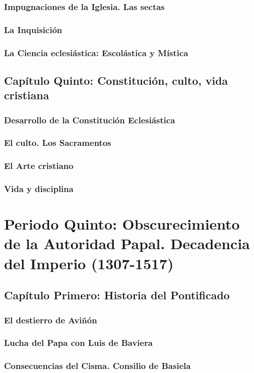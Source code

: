 \raggedbottom{} \documentclass[12pt, a4paper]{book}
\begin{document}
\section{Impugnaciones de la Iglesia. Las sectas}
\section{La Inquisición}
\section{La Ciencia eclesiástica: Escolástica y Mística}
\chapter{Capítulo Quinto: Constitución, culto, vida cristiana}
\section{Desarrollo de la Constitución Eclesiástica}
\section{El culto. Los Sacramentos}
\section{El Arte cristiano}
\section{Vida y disciplina}
\part{Periodo Quinto: Obscurecimiento de la Autoridad Papal. Decadencia del Imperio (1307-1517)}
\chapter{Capítulo Primero: Historia del Pontificado}
\section{El destierro de Aviñón}
\section{Lucha del Papa con Luis de Baviera}
\section{Consecuencias del Cisma. Consilio de Basiela}
\end{document}
